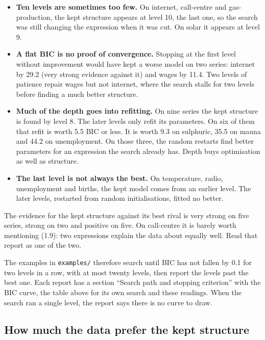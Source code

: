 \documentclass[
]{article}
\providecommand{\tightlist}{%
  \setlength{\itemsep}{0pt}\setlength{\parskip}{0pt}}
\begin{document}
\begin{itemize}
\tightlist
\item
  \textbf{Ten levels are sometimes too few.} On internet, call-centre
  and gas-production, the kept structure appears at level 10, the last
  one, so the search was still changing the expression when it was cut.
  On solar it appears at level 9.
\item
  \textbf{A flat BIC is no proof of convergence.} Stopping at the first
  level without improvement would have kept a worse model on two series:
  internet by 29.2 (very strong evidence against it) and wages by 11.4.
  Two levels of patience repair wages but not internet, where the search
  stalls for two levels before finding a much better structure.
\item
  \textbf{Much of the depth goes into refitting.} On nine series the
  kept structure is found by level 8. The later levels only refit its
  parameters. On six of them that refit is worth 5.5 BIC or less. It is
  worth 9.3 on sulphuric, 35.5 on mauna and 44.2 on unemployment. On
  those three, the random restarts find better parameters for an
  expression the search already has. Depth buys optimisation as well as
  structure.
\item
  \textbf{The last level is not always the best.} On temperature, radio,
  unemployment and births, the kept model comes from an earlier level.
  The later levels, restarted from random initialisations, fitted no
  better.
\end{itemize}

The evidence for the kept structure against its best rival is very
strong on five series, strong on two and positive on five. On
call-centre it is barely worth mentioning (1.9): two expressions explain
the data about equally well. Read that report as one of the two.

The examples in \texttt{examples/} therefore search until BIC has not
fallen by 0.1 for two levels in a row, with at most twenty levels, then
report the levels past the best one. Each report has a section ``Search
path and stopping criterion'' with the BIC curve, the table above for
its own search and these readings. When the search ran a single level,
the report says there is no curve to draw.

\subsection{How much the data prefer the kept
structure}\label{how-much-the-data-prefer-the-kept-structure}
\end{document}
